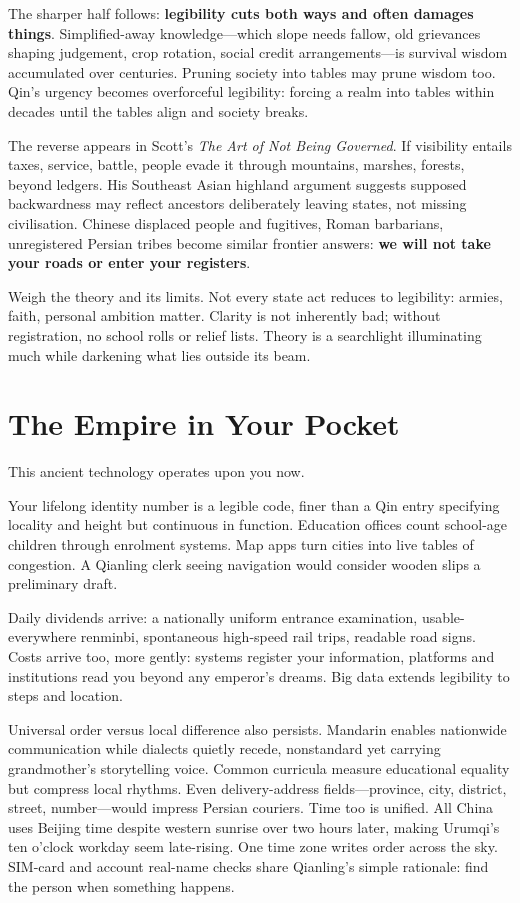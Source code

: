 The sharper half follows: \textbf{legibility cuts both ways and often damages things}. Simplified-away knowledge---which slope needs fallow, old grievances shaping judgement, crop rotation, social credit arrangements---is survival wisdom accumulated over centuries. Pruning society into tables may prune wisdom too. Qin's urgency becomes overforceful legibility: forcing a realm into tables within decades until the tables align and society breaks.

The reverse appears in Scott's \textit{The Art of Not Being Governed}. If visibility entails taxes, service, battle, people evade it through mountains, marshes, forests, beyond ledgers. His Southeast Asian highland argument suggests supposed backwardness may reflect ancestors deliberately leaving states, not missing civilisation. Chinese displaced people and fugitives, Roman barbarians, unregistered Persian tribes become similar frontier answers: \textbf{we will not take your roads or enter your registers}.

Weigh the theory and its limits. Not every state act reduces to legibility: armies, faith, personal ambition matter. Clarity is not inherently bad; without registration, no school rolls or relief lists. Theory is a searchlight illuminating much while darkening what lies outside its beam.

\section{The Empire in Your Pocket}
This ancient technology operates upon you now.

Your lifelong identity number is a legible code, finer than a Qin entry specifying locality and height but continuous in function. Education offices count school-age children through enrolment systems. Map apps turn cities into live tables of congestion. A Qianling clerk seeing navigation would consider wooden slips a preliminary draft.

Daily dividends arrive: a nationally uniform entrance examination, usable-everywhere renminbi, spontaneous high-speed rail trips, readable road signs. Costs arrive too, more gently: systems register your information, platforms and institutions read you beyond any emperor's dreams. Big data extends legibility to steps and location.

Universal order versus local difference also persists. Mandarin enables nationwide communication while dialects quietly recede, nonstandard yet carrying grandmother's storytelling voice. Common curricula measure educational equality but compress local rhythms. Even delivery-address fields---province, city, district, street, number---would impress Persian couriers. Time too is unified. All China uses Beijing time despite western sunrise over two hours later, making Urumqi's ten o'clock workday seem late-rising. One time zone writes order across the sky. SIM-card and account real-name checks share Qianling's simple rationale: find the person when something happens.

